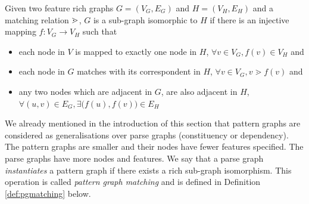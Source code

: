     \begin{definition}\label{def:rsgisomorphism}
        Given two feature rich graphs $G=(V_G,E_G)$ and $H=(V_H,E_H)$ and a matching relation $\operatorname{\gtrdot}$, $G$ is a sub-graph isomorphic to $H$ if there is an injective mapping $f:V_G \rightarrow V_H$ such that
        \begin{itemize}
            \item each node in $V$ is mapped to exactly one node in $H$, $\forall v \in V_G, f(v) \in V_H$ and
            \item each node in $G$ matches with its correspondent in $H$, $\forall v \in V_G, v \gtrdot f(v)$ and
            \item any two nodes which are adjacent in $G$, are also adjacent in $H$, $\forall (u,v) \in E_G, \exists \big(f(u), f(v)\big) \in E_H $
        \end{itemize}
    \end{definition}

    

    We already mentioned in the introduction of this section that pattern graphs are considered as generalisations over parse graphs (constituency or dependency). The pattern graphs are smaller and their nodes have fewer features specified. The parse graphs have more nodes and features. We say that a parse graph \textit{instantiates} a pattern graph if there exists a rich sub-graph isomorphism. This operation is called \textit{pattern graph matching} and is defined in Definition \ref{def:pgmatching} below. 

